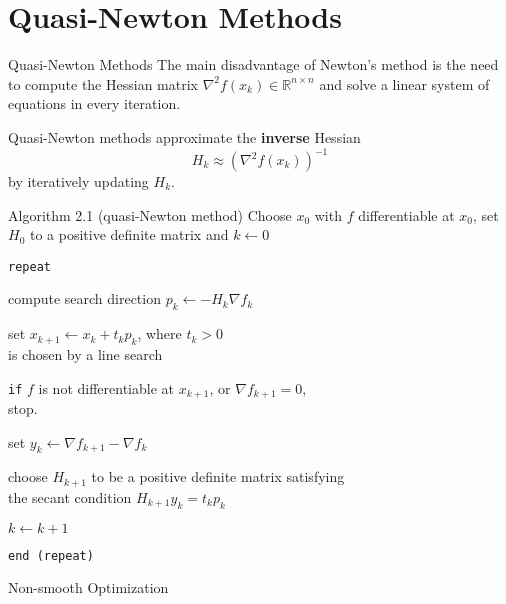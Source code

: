 \documentclass{beamer}
\begin{document}
\section{Quasi-Newton Methods}
\begin{frame}{Quasi-Newton Methods}
     {
        The main disadvantage of Newton's method
        is the need to compute
        the Hessian matrix $\nabla^2 f(x_k) \in \mathbb{R}^{n \times n}$
        and solve a linear system of equations
        in every iteration.
    }

     {
        Quasi-Newton methods approximate the
        \textbf{inverse} Hessian
        $$H_k \approx (\nabla^2 f(x_k))^{-1}$$
        by iteratively updating $H_k$.
    }

     {
        \begin{block}{Algorithm 2.1 (quasi-Newton method)}
            Choose $x_0$ with $f$ differentiable at $x_0$,
            set $H_0$ to a positive definite matrix and
            $k \leftarrow 0$

            \texttt{repeat}

            \qquad compute search direction $p_k \leftarrow -H_k \nabla f_k$

            \qquad set $x_{k + 1} \leftarrow x_k + t_k p_k$,
            where $t_k > 0$ \\
            \qquad\qquad is chosen by a line search

            \qquad \texttt{if} $f$ is not differentiable at $x_{k + 1}$,
            or $\nabla f_{k + 1} = 0$, \\
            \qquad\qquad stop.

            \qquad set $y_k \leftarrow \nabla f_{k + 1} - \nabla f_k$

            \qquad choose $H_{k + 1}$ to be a positive definite matrix
            satisfying \\
            \qquad\qquad the secant condition $H_{k + 1} y_k = t_k p_k$

            \qquad $k \leftarrow k + 1$

            \texttt{end (repeat)}
        \end{block}
    }
\end{frame}

\begin{frame}{Non-smooth Optimization}
\end{frame}
\end{document}
